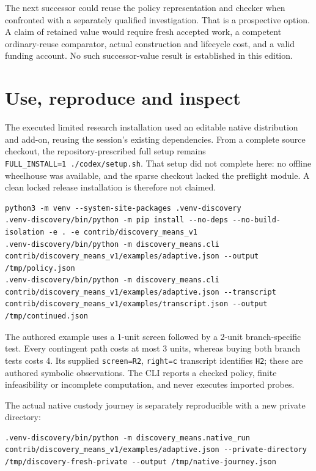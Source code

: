 \documentclass[10pt,letterpaper]{article}
\begin{document}
The next successor could reuse the policy representation and checker
when confronted with a separately qualified investigation. That is a
prospective option. A claim of retained value would require fresh
accepted work, a competent ordinary-reuse comparator, actual
construction and lifecycle cost, and a valid funding account. No such
successor-value result is established in this edition.

\hypertarget{use-reproduce-and-inspect}{%
\section{Use, reproduce and inspect}\label{use-reproduce-and-inspect}}

The executed limited research installation used an editable native
distribution and add-on, reusing the session's existing dependencies.
From a complete source checkout, the repository-prescribed full setup
remains \texttt{FULL\_INSTALL=1\ ./codex/setup.sh}. That setup did not
complete here: no offline wheelhouse was available, and the sparse
checkout lacked the preflight module. A clean locked release
installation is therefore not claimed.

\begin{verbatim}
python3 -m venv --system-site-packages .venv-discovery
.venv-discovery/bin/python -m pip install --no-deps --no-build-isolation -e . -e contrib/discovery_means_v1
.venv-discovery/bin/python -m discovery_means.cli contrib/discovery_means_v1/examples/adaptive.json --output /tmp/policy.json
.venv-discovery/bin/python -m discovery_means.cli contrib/discovery_means_v1/examples/adaptive.json --transcript contrib/discovery_means_v1/examples/transcript.json --output /tmp/continued.json
\end{verbatim}

The authored example uses a 1-unit screen followed by a 2-unit
branch-specific test. Every contingent path costs at most 3 units,
whereas buying both branch tests costs 4. Its supplied
\texttt{screen=R2}, \texttt{right=c} transcript identifies \texttt{H2};
these are authored symbolic observations. The CLI reports a checked
policy, finite infeasibility or incomplete computation, and never
executes imported probes.

The actual native custody journey is separately reproducible with a new
private directory:

\begin{verbatim}
.venv-discovery/bin/python -m discovery_means.native_run contrib/discovery_means_v1/examples/adaptive.json --private-directory /tmp/discovery-fresh-private --output /tmp/native-journey.json
\end{verbatim}
\end{document}
